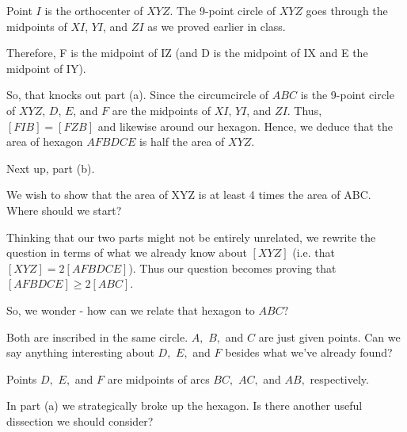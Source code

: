 

Point $I$ is the orthocenter of $XYZ$. The 9-point circle of $XYZ$ goes through the midpoints of $XI$, $YI$, and $ZI$ as we proved earlier in class.

Therefore, F is the midpoint of IZ (and D is the midpoint of IX and E the midpoint of IY).

So, that knocks out part (a). Since the circumcircle of $ABC$ is the 9-point circle of $XYZ$, $D$, $E$, and $F$ are the midpoints of $XI$, $YI$, and $ZI$. Thus, $[FIB] = [FZB]$ and likewise around our hexagon. Hence, we deduce that the area of hexagon $AFBDCE$ is half the area of $XYZ$.

Next up, part (b).

We wish to show that the area of XYZ is at least 4 times the area of ABC. Where should we start?

Thinking that our two parts might not be entirely unrelated, we rewrite the question in terms of what we already know about $[XYZ]$ (i.e. that $[XYZ] = 2[AFBDCE]$). Thus our question becomes proving that $[AFBDCE] \ge 2[ABC]$.

So, we wonder - how can we relate that hexagon to $ABC?$

Both are inscribed in the same circle. $A,$ $B,$ and $C$ are just given points. Can we say anything interesting about $D,$ $E,$ and $F$ besides what we've already found?


Points $D,$ $E,$ and $F$ are midpoints of arcs $BC,$ $AC,$ and $AB,$ respectively.

In part (a) we strategically broke up the hexagon. Is there another useful dissection we should consider?

